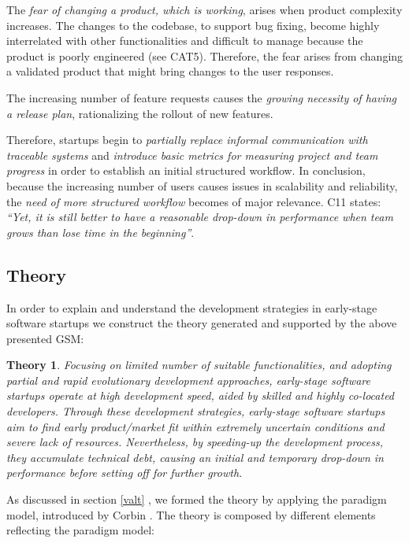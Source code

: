 \documentclass[10pt,journal,letterpaper,compsoc]{IEEEtran}
\newtheorem*{theory}{Theory}
\begin{document}
The \textit{fear of changing a product, which is working}, arises when product complexity increases. The changes to the codebase, to support bug fixing, become highly interrelated with other functionalities and difficult to manage because the product is poorly engineered (see CAT5). Therefore, the fear arises from changing a validated product that might bring changes to the user responses.

The increasing number of feature requests causes the \textit{growing necessity of having a release plan}, rationalizing the rollout of new features.

Therefore, startups begin to \textit{partially replace informal communication with traceable systems} and \textit{introduce basic metrics for measuring project and team progress} in order to establish an initial structured workflow. In conclusion, because the increasing number of users causes issues in scalability and reliability, the \textit{need of more structured workflow} becomes of major relevance. C11 states: \textit{``Yet, it is still better to have a reasonable drop-down in performance when team grows than lose time in the beginning''}.
\subsection{Theory}
\label{res:gsm:th}
In order to explain and understand the development strategies in early-stage software startups we construct the theory generated and supported by the above presented GSM:

\begin{theory}
Focusing on limited number of suitable functionalities, and adopting partial and rapid evolutionary development approaches, early-stage software startups operate at high development speed, aided by skilled and highly co-located developers. Through these development strategies, early-stage software startups aim to find early product/market fit within extremely uncertain conditions and severe lack of resources. Nevertheless, by speeding-up the development process, they accumulate technical debt, causing an initial and temporary drop-down in performance before setting off for further growth.
\end{theory}

As discussed in section \ref{valt}%
, we formed the theory by applying the paradigm model, introduced by Corbin \cite{Corbin1990}. The theory is composed by different elements reflecting the paradigm model:
\end{document}
